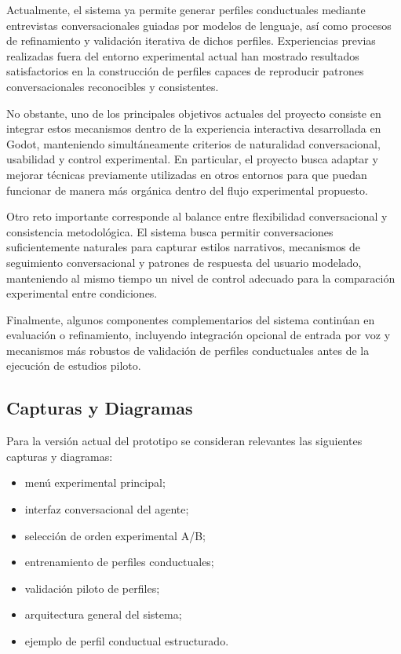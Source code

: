 \documentclass[12pt]{article}
\begin{document}
Actualmente, el sistema ya permite generar perfiles conductuales mediante entrevistas conversacionales guiadas por modelos de lenguaje, así como procesos de refinamiento y validación iterativa de dichos perfiles. Experiencias previas realizadas fuera del entorno experimental actual han mostrado resultados satisfactorios en la construcción de perfiles capaces de reproducir patrones conversacionales reconocibles y consistentes.

No obstante, uno de los principales objetivos actuales del proyecto consiste en integrar estos mecanismos dentro de la experiencia interactiva desarrollada en Godot, manteniendo simultáneamente criterios de naturalidad conversacional, usabilidad y control experimental. En particular, el proyecto busca adaptar y mejorar técnicas previamente utilizadas en otros entornos para que puedan funcionar de manera más orgánica dentro del flujo experimental propuesto.

Otro reto importante corresponde al balance entre flexibilidad conversacional y consistencia metodológica. El sistema busca permitir conversaciones suficientemente naturales para capturar estilos narrativos, mecanismos de seguimiento conversacional y patrones de respuesta del usuario modelado, manteniendo al mismo tiempo un nivel de control adecuado para la comparación experimental entre condiciones.

Finalmente, algunos componentes complementarios del sistema continúan en evaluación o refinamiento, incluyendo integración opcional de entrada por voz y mecanismos más robustos de validación de perfiles conductuales antes de la ejecución de estudios piloto.


\subsection{Capturas y Diagramas}

Para la versión actual del prototipo se consideran relevantes las siguientes capturas y diagramas:

\begin{itemize}
\item menú experimental principal;
\item interfaz conversacional del agente;
\item selección de orden experimental A/B;
\item entrenamiento de perfiles conductuales;
\item validación piloto de perfiles;
\item arquitectura general del sistema;
\item ejemplo de perfil conductual estructurado.
\end{itemize}
\end{document}
